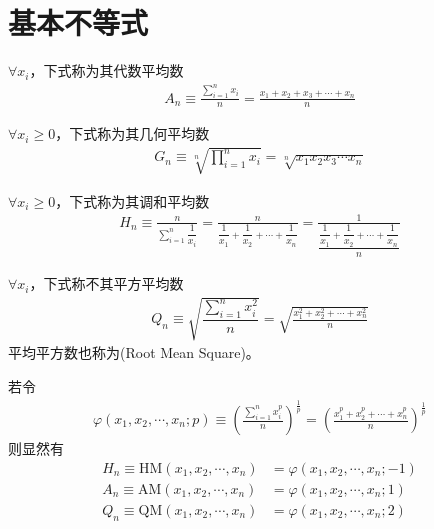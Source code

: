 


\section{基本不等式}
\label{sec:basic-inequalities}

\begin{definition}
  $\forall x_i$，下式称为其代数平均数
  \begin{align*}
    A_n\equiv\frac{\sum\limits_{i=1}^{n} x_i}{n}
    =\frac{x_1+x_2+x_3+\cdots+x_n}{n}
  \end{align*}
\end{definition}

\begin{definition}
  $\forall x_i\ge0$，下式称为其几何平均数
  \begin{align*}
    G_n\equiv\sqrt[n]{\prod_{i=1}^{n}x_i}
    =\sqrt[n]{x_1 x_2 x_3\cdots x_n}
  \end{align*}
\end{definition}

\begin{definition}
  $\forall x_i\ge0$，下式称为其调和平均数
  \begin{align*}
    H_n\equiv\frac{n}{\sum\limits_{i=1}^{n}\dfrac1{x_i}}
    =\frac{n}{\dfrac1{x_1}+\dfrac1{x_2}+\cdots+\dfrac1{x_n}}
    =\frac{1}{\dfrac{\dfrac1{x_1}+\dfrac1{x_2}+\cdots+\dfrac1{x_n}}{n}}
  \end{align*}
\end{definition}

\begin{definition}
  $\forall x_i$，下式称不其平方平均数
  \begin{align*}
    Q_n\equiv\sqrt{\dfrac{\sum\limits_{i=1}^n x_i^2}{n}}
    =\sqrt{\frac{x_1^2+x_2^2+\cdots+x_n^2}{n}}
  \end{align*}
  平均平方数也称为(Root Mean Square)。
\end{definition}

若令
\begin{align*}
  \varphi(x_1,x_2,\cdots,x_n;p)\equiv\left(\frac{\sum_{i=1}^{n} x_i^p}{n} \right)^{\frac1p}
  =\left( \frac{x_1^p + x_2^p + \cdots + x_n^p}{n} \right)^{\frac1p}
\end{align*}
则显然有
\begin{align*}
  H_n \equiv \mathrm{HM}(x_1,x_2,\cdots,x_n)&=\varphi(x_1,x_2,\cdots,x_n;-1)\\
  A_n \equiv \mathrm{AM}(x_1,x_2,\cdots,x_n)&=\varphi(x_1,x_2,\cdots,x_n;1)\\
  Q_n \equiv \mathrm{QM}(x_1,x_2,\cdots,x_n)&=\varphi(x_1,x_2,\cdots,x_n;2)
\end{align*}

